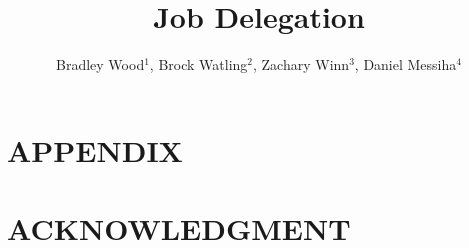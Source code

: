\documentclass[letterpaper, 11 pt, conference]{ieeeconf}
\title{Job Delegation}
\author{Bradley Wood$^{1}$, Brock Watling$^{2}$, Zachary Winn$^{3}$, Daniel Messiha$^{4}$}
\begin{document}
    \maketitle
    \thispagestyle{empty}
    \pagestyle{empty}

    

    

    

    

    

    

    

    

    \addtolength{\textheight}{-12cm}   %

    \section*{APPENDIX}

    \section*{ACKNOWLEDGMENT}


    \begin{thebibliography}{99}

    \end{thebibliography}
\end{document}
